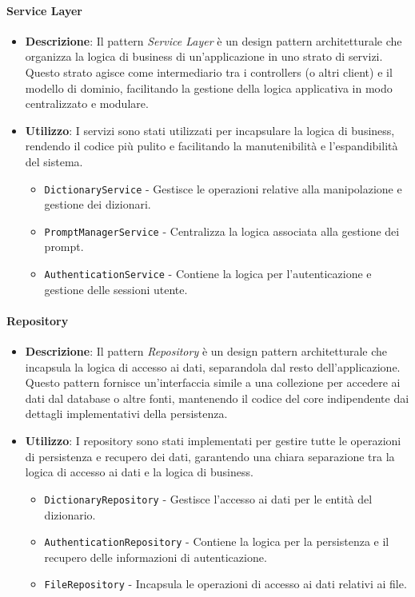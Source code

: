 \paragraph{Service Layer}
\begin{itemize}
    \item \textbf{Descrizione}: Il pattern \textit{Service Layer} è un design pattern architetturale che organizza la logica di business di un'applicazione in uno strato di servizi. Questo strato agisce come intermediario tra i controllers (o altri client) e il modello di dominio, facilitando la gestione della logica applicativa in modo centralizzato e modulare.
    \item \textbf{Utilizzo}: I servizi sono stati utilizzati per incapsulare la logica di business, rendendo il codice più pulito e facilitando la manutenibilità e l'espandibilità del sistema.
    \begin{itemize}
        \item \texttt{DictionaryService} - Gestisce le operazioni relative alla manipolazione e gestione dei dizionari.
        \item \texttt{PromptManagerService} - Centralizza la logica associata alla gestione dei prompt.
        \item \texttt{AuthenticationService} - Contiene la logica per l'autenticazione e gestione delle sessioni utente.
    \end{itemize}
\end{itemize}

\paragraph{Repository}
\begin{itemize}
    \item \textbf{Descrizione}: Il pattern \textit{Repository} è un design pattern architetturale che incapsula la logica di accesso ai dati, separandola dal resto dell'applicazione. Questo pattern fornisce un'interfaccia simile a una collezione per accedere ai dati dal database o altre fonti, mantenendo il codice del core indipendente dai dettagli implementativi della persistenza.
    \item \textbf{Utilizzo}: I repository sono stati implementati per gestire tutte le operazioni di persistenza e recupero dei dati, garantendo una chiara separazione tra la logica di accesso ai dati e la logica di business.
    \begin{itemize}
        \item \texttt{DictionaryRepository} - Gestisce l'accesso ai dati per le entità del dizionario.
        \item \texttt{AuthenticationRepository} - Contiene la logica per la persistenza e il recupero delle informazioni di autenticazione.
        \item \texttt{FileRepository} - Incapsula le operazioni di accesso ai dati relativi ai file.
    \end{itemize}
\end{itemize}

